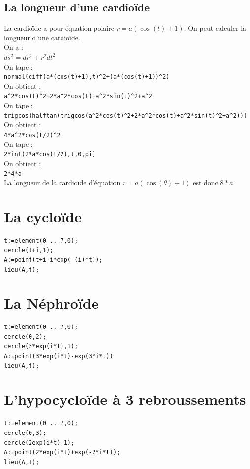 \documentclass[a4paper,11pt]{book}
\begin{document}
\subsection{La longueur d'une cardio\"{i}de}
La cardio\"{i}de a pour \'equation polaire $r=a(\cos(t)+1)$.
On peut calculer la longueur d'une cardio\"{i}de. \\
On a :\\
$ds^2=dr^2+r^2dt^2$\\
On tape :\\
{\tt normal(diff(a*(cos(t)+1),t)\verb|^|2+(a*(cos(t)+1))\verb|^|2)} \\
On obtient :\\
{\tt a\verb|^|2*cos(t)\verb|^|2+2*a\verb|^|2*cos(t)+a\verb|^|2*sin(t)\verb|^|2+a\verb|^|2}\\
On tape :\\
{\tt  trigcos(halftan(trigcos(a\verb|^|2*cos(t)\verb|^|2+2*a\verb|^|2*cos(t)+a\verb|^|2*sin(t)\verb|^|2+a\verb|^|2)))}\\
On obtient :\\
{\tt 4*a\verb|^|2*cos(t/2)\verb|^|2 }\\
On tape :\\
{\tt  2*int(2*a*cos(t/2),t,0,pi)}\\
On obtient :\\
{\tt 2*4*a}\\
La longueur de la cardio\"{i}de d'\'equation $r=a(\cos(\theta)+1)$ est donc 
$8*a$.
\section{La cyclo\"ide}
\begin{verbatim}
t:=element(0 .. 7,0);
cercle(t+i,1);
A:=point(t+i-i*exp(-(i)*t));
lieu(A,t);
\end{verbatim}
\section{La N\'ephro\"ide}
\begin{verbatim}
t:=element(0 .. 7,0);
cercle(0,2);
cercle(3*exp(i*t),1);
A:=point(3*exp(i*t)-exp(3*i*t))
lieu(A,t);
\end{verbatim}
\section{L'hypocyclo\"ide \`a 3 rebroussements }
\begin{verbatim}
t:=element(0 .. 7,0);
cercle(0,3);
cercle(2exp(i*t),1);
A:=point(2*exp(i*t)+exp(-2*i*t));
lieu(A,t);
\end{verbatim}
\end{document}
